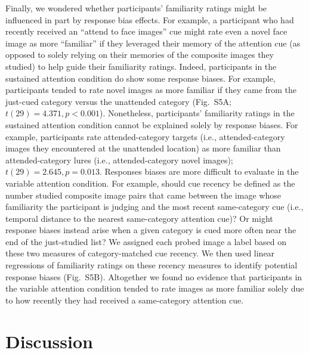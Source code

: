 \documentclass[english]{article}
\newcommand{\responseBias}{S5}
\begin{document}
Finally, we wondered whether participants' familiarity ratings might be
influenced in part by response bias effects. For example, a participant who had
recently received an ``attend to face images'' cue might rate even a novel face
image as more ``familiar'' if they leveraged their memory of the attention cue
(as opposed to solely relying on their memories of the composite images they
studied) to help guide their familiarity ratings. Indeed, participants in the
sustained attention condition do show some response biases. For example,
participants tended to rate novel images as more familiar if they came from the
just-cued category versus the unattended category (Fig.~\responseBias A; $t(29)
= 4.371, p < 0.001$). Nonetheless, participants' familiarity ratings in the
sustained attention condition cannot be explained solely by response biases.
For example, participants rate attended-category targets (i.e.,
attended-category images they encountered at the unattended location) as more
familiar than attended-category lures (i.e., attended-category novel images);
$t(29) = 2.645, p = 0.013$. Responses biases are more difficult to evaluate in
the variable attention condition. For example, should cue recency be defined as
the number studied composite image pairs that came between the image whose
familiarity the participant is judging and the most recent same-category cue
(i.e., temporal distance to the nearest same-category attention cue)? Or might
response biases instead arise when a given category is cued more often near the
end of the just-studied list? We assigned each probed image a label based on
these two measures of category-matched cue recency. We then used linear
regressions of familiarity ratings on these recency measures to identify
potential response biases (Fig.~\responseBias B). Altogether we found no
evidence that participants in the variable attention condition tended to rate
images as more familiar solely due to how recently they had received a
same-category attention cue.

\section*{Discussion}
\end{document}
